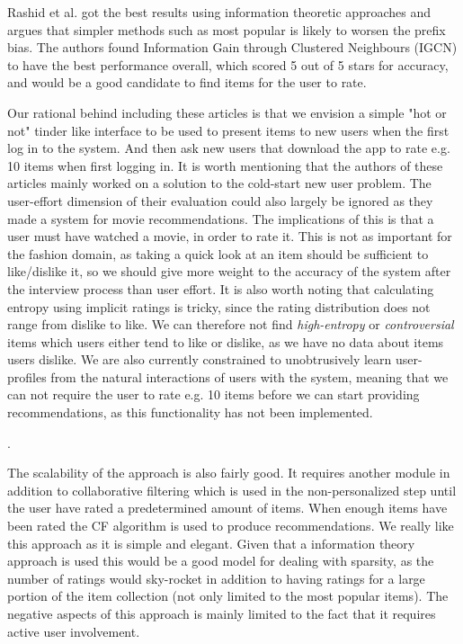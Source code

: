 Rashid et al. \cite{Rashid2008} got the best results using information
theoretic approaches and argues that simpler methods such as most popular is
likely to worsen the prefix bias. The authors found Information Gain through
Clustered Neighbours (IGCN) to have the best performance overall, which scored
5 out of 5 stars for accuracy, and would be a good candidate to find items for
the user to rate.

Our rational behind including these articles is that we envision a simple "hot
or not" tinder like interface to be used to present items to new users when the
first log in to the system. And then ask new users that download the app to
rate e.g. 10 items when first logging in. It is worth mentioning that the
authors of these articles mainly worked on a solution to the cold-start new
user problem. The user-effort dimension of their evaluation could also largely
be ignored as they made a system for movie recommendations. The implications of
this is that a user must have watched a movie, in order to rate it. This is not
as important for the fashion domain, as taking a quick look at an item should
be sufficient to like/dislike it, so we should give more weight to the accuracy
of the system after the interview process than user effort. It is also worth
noting that calculating entropy using implicit ratings is tricky, since the
rating distribution does not range from dislike to like. We can therefore not
find \emph{high-entropy} or \emph{controversial} items which users either tend
to like or dislike, as we have no data about items users dislike.  We are also currently constrained to unobtrusively learn
user-profiles from the natural interactions of users with the system, meaning
that we can not require the user to rate e.g. 10 items before we can start
providing recommendations, as this functionality has not been implemented.

.

The scalability of the approach is also fairly good. It requires another module
in addition to collaborative filtering which is used in the non-personalized
step until the user have rated a predetermined amount of items. When enough
items have been rated the CF algorithm is used to produce recommendations. We
really like this approach as it is simple and elegant. Given that a information
theory approach is used this would be a good model for dealing with sparsity,
as the number of ratings would sky-rocket in addition to having ratings for a
large portion of the item collection (not only limited to the most popular
items). The negative aspects of this approach is mainly limited to the fact
that it requires active user involvement.

